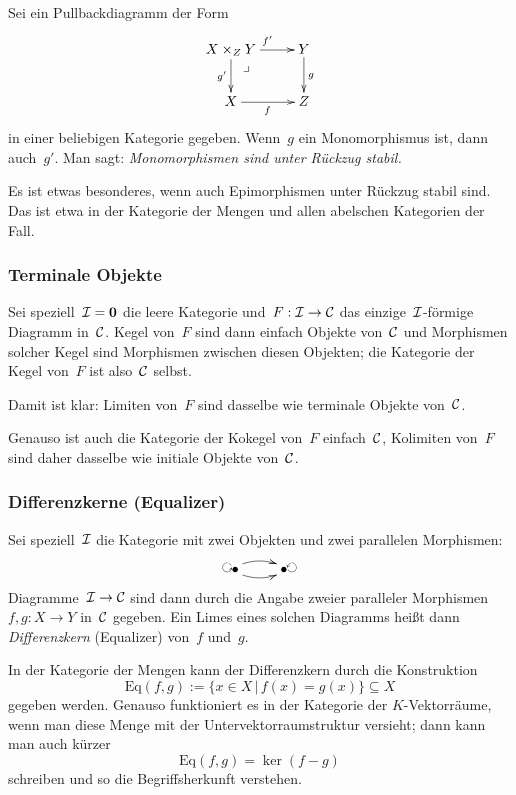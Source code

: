 \begin{bsp}Sei ein Pullbackdiagramm der Form
\[ \xymatrix{
  \ar @{} [dr] |{\begin{array}{l}\lrcorner\ \ \ \ \ \ \ \ \ \\\\\end{array}}
  X \times_Z Y \ar[r]^{f'} \ar[d]_{g'} & Y \ar[d]^g \\
  X \ar[r]_f & Z
} \]
in einer beliebigen Kategorie gegeben. Wenn~$g$ ein Monomorphismus ist, dann auch~$g'$.
Man sagt: \emph{Monomorphismen sind unter Rückzug stabil.}
\end{bsp}
\begin{bem}Es ist etwas besonderes, wenn auch Epimorphismen unter Rückzug
stabil sind. Das ist etwa in der Kategorie der Mengen und allen abelschen
Kategorien der Fall.\end{bem}


\subsubsection*{Terminale Objekte}

Sei speziell~$\mathcal{I} = \mathbf{0}$ die leere Kategorie und~$F:\mathcal{I} \to \mathcal{C}$ das
einzige~$\mathcal{I}$-förmige Diagramm in~$\mathcal{C}$. Kegel von~$F$ sind dann einfach Objekte
von~$\mathcal{C}$ und Morphismen solcher Kegel sind Morphismen zwischen diesen Objekten; die
Kategorie der Kegel von~$F$ ist also~$\mathcal{C}$ selbst.

Damit ist klar: Limiten von~$F$ sind dasselbe wie terminale Objekte von~$\mathcal{C}$.

Genauso ist auch die Kategorie der Kokegel von~$F$ einfach~$\mathcal{C}$, Kolimiten
von~$F$ sind daher dasselbe wie initiale Objekte von~$\mathcal{C}$.


\subsubsection*{Differenzkerne (Equalizer)}

Sei speziell~$\mathcal{I}$ die Kategorie mit zwei Objekten und zwei parallelen
Morphismen:
\[ \xymatrix{
  \reflectbox{$\bullet \rotatebox{90}{$\circlearrowright$}$}
  \ar@/^/[r] \ar@/_/[r] & \bullet
  \rotatebox{90}{$\circlearrowleft$}
} \]
Diagramme~$\mathcal{I} \to \mathcal{C}$ sind dann durch die Angabe zweier paralleler Morphismen
$f,g:X \to Y$ in~$\mathcal{C}$ gegeben. Ein Limes eines solchen Diagramms heißt dann
\emph{Differenzkern} (Equalizer) von~$f$ und~$g$.

In der Kategorie der Mengen kann der Differenzkern durch die Konstruktion
\[ \mathrm{Eq}(f,g) := \{ x \in X \,|\, f(x) = g(x) \} \subseteq X \]
gegeben werden. Genauso funktioniert es in der Kategorie der $K$-Vektorräume,
wenn man diese Menge mit der Untervektorraumstruktur versieht; dann kann man
auch kürzer
\[ \mathrm{Eq}(f,g) = \ker(f - g) \]
schreiben und so die Begriffsherkunft verstehen.

